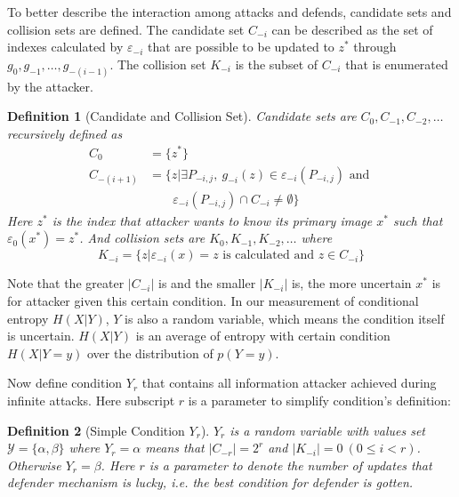\documentclass[10pt, conference, compsocconf]{IEEEtran}
\newtheorem{mydef}{Definition}
\begin{document}
        To better describe the interaction among attacks
        and defends, candidate sets and collision sets are defined.
		The candidate set $C_{-i}$ can be described as the set of indexes
        calculated by $\varepsilon_{-i}$ that are possible to be
        updated to $z^*$ through $g_0, g_{-1}, \ldots, g_{-(i-1)}$. The collision set $K_{-i}$ is the
        subset of $C_{-i}$ that is enumerated by the attacker.
        \begin{mydef}[Candidate and Collision Set]
            Candidate sets are $C_0, C_{-1}, C_{-2}, \ldots$ recursively defined as
            \begin{align*}
                C_0 &= \{z^*\}\\
                C_{-(i+1)} &= \{z | \exists P_{-i, j},~
                    g_{-i}(z) \in \varepsilon_{-i}(P_{-i, j}) \text{ and } \\
                    & \;\;\;\;\;\;\; \varepsilon_{-i}(P_{-i, j}) \cap C_{-i} \neq \emptyset \}
            \end{align*}
            Here $z^*$ is the index that attacker wants to know its primary image
            $x^*$ such that $\varepsilon_0(x^*) = z^*$. And collision sets are $K_0, K_{-1}, K_{-2}, \ldots$ where
            \begin{equation*}
                K_{-i} = \{z | \varepsilon_{-i}(x) = z \text{ is calculated and } z \in C_{-i} \}
            \end{equation*}
        \end{mydef}
        
        Note that the greater $|C_{-i}|$ is and the smaller $|K_{-i}|$ is,
        the more uncertain $x^*$ is for attacker given this certain
        condition. In our measurement
        of conditional entropy $H(X|Y)$, $Y$ is also a random variable,
        which means the condition itself is uncertain. $H(X|Y)$ is
        an average of entropy with certain condition $H(X|Y = y)$ 
        over the distribution of $p(Y = y)$.

        Now define condition $Y_r$ that contains all information
        attacker achieved during infinite attacks. Here subscript $r$
        is a parameter to simplify condition's definition:
        \begin{mydef}[Simple Condition $Y_r$]
            $Y_r$ is a random variable with values set
            $\mathcal Y = \{ \alpha, \beta \}$ where
            $Y_r = \alpha$ means that $|C_{-r}| = 2^r$
            and $|K_{-i}| = 0~(0 \leq i < r)$.
            Otherwise $Y_r = \beta$.
            Here $r$ is a parameter to denote the number
            of updates that defender mechanism is lucky,
            i.e. the best condition for defender is gotten.
        \end{mydef}
\end{document}
